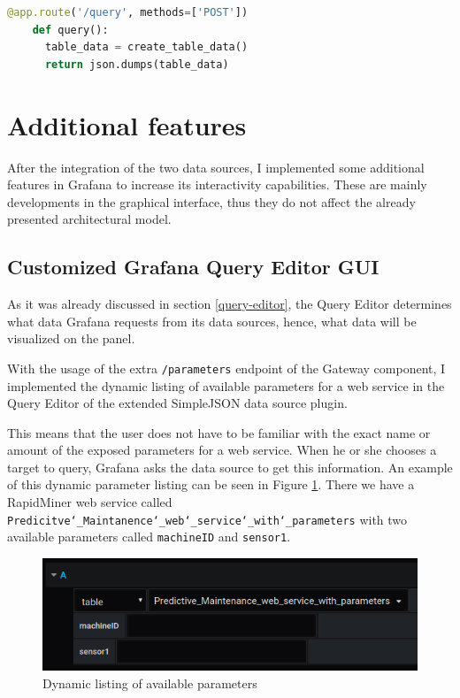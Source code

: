 \begin{minipage}[b]{\linewidth}
	\centering
	\begin{lstlisting}[language=Python, frame=single, mathescape,%
	caption={Exposing the prepared data}, label=lst:python-query]
	@app.route('/query', methods=['POST'])
	def query():
	  table_data = create_table_data()
	  return json.dumps(table_data)
	\end{lstlisting}
\end{minipage}

\section{Additional features}

After the integration of the two data sources, I implemented some additional features in Grafana to increase its interactivity capabilities. These are mainly developments in the graphical interface, thus they do not affect the already presented architectural model.

\subsection{Customized Grafana Query Editor GUI}

As it was already discussed in section \ref{query-editor}, the Query Editor determines what data Grafana requests from its data sources, hence, what data will be visualized on the panel. 

With the usage of the extra \texttt{/parameters} endpoint of the Gateway component, I implemented the dynamic listing of available parameters for a web service in the Query Editor of the extended SimpleJSON data source plugin.

This means that the user does not have to be familiar with the exact name or amount of the exposed parameters for a web service. When he or she chooses a target to query, Grafana asks the data source to get this information. An example of this dynamic parameter listing can be seen in Figure \ref{fig:dynamic-parameters}. There we have a RapidMiner web service called \texttt{Predicitve\char`_Maintanence\char`_web\char`_service\char`_with\char`_parameters} with two available parameters called \texttt{machineID} and \texttt{sensor1}.

\begin{figure}[h]
	\centering
	\includegraphics[width=130mm, keepaspectratio]{figures/dynamic-parameters.png}
	\caption{Dynamic listing of available parameters}
	\label{fig:dynamic-parameters}
\end{figure}

